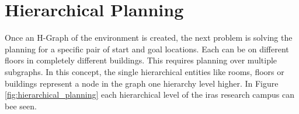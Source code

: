 \section{Hierarchical Planning}
\label{sec:hierarchical_planning_method}

Once an H-Graph of the environment is created, the next problem is solving the planning for a specific pair of start and goal locations. Each can be on different floors in completely different buildings. This requires planning over multiple subgraphs. In this concept, the single hierarchical entities like rooms, floors or buildings represent a node in the graph one hierarchy level higher. In Figure \ref{fig:hierarchical_planning} each hierarchical level of the \gls{iras} research campus can bee seen. 

